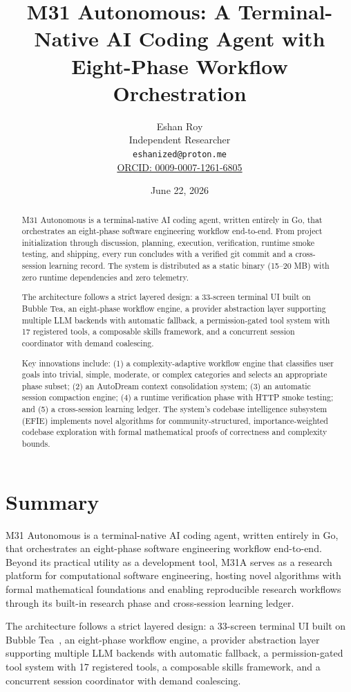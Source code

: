 \documentclass[11pt]{article}
\title{M31 Autonomous: A Terminal-Native AI Coding Agent with Eight-Phase Workflow Orchestration}
\author{
  Eshan Roy\\
  Independent Researcher\\
  \texttt{eshanized@proton.me}\\
  \href{https://orcid.org/0009-0007-1261-6805}{ORCID: 0009-0007-1261-6805}
}
\date{June 22, 2026}
\begin{document}
\maketitle

\begin{abstract}
M31 Autonomous is a terminal-native AI coding agent, written entirely in Go, that orchestrates an eight-phase software engineering workflow end-to-end. From project initialization through discussion, planning, execution, verification, runtime smoke testing, and shipping, every run concludes with a verified git commit and a cross-session learning record. The system is distributed as a static binary (15--20 MB) with zero runtime dependencies and zero telemetry.

The architecture follows a strict layered design: a 33-screen terminal UI built on Bubble Tea, an eight-phase workflow engine, a provider abstraction layer supporting multiple LLM backends with automatic fallback, a permission-gated tool system with 17 registered tools, a composable skills framework, and a concurrent session coordinator with demand coalescing.

Key innovations include: (1) a complexity-adaptive workflow engine that classifies user goals into trivial, simple, moderate, or complex categories and selects an appropriate phase subset; (2) an AutoDream context consolidation system; (3) an automatic session compaction engine; (4) a runtime verification phase with HTTP smoke testing; and (5) a cross-session learning ledger. The system's codebase intelligence subsystem (EFIE) implements novel algorithms for community-structured, importance-weighted codebase exploration with formal mathematical proofs of correctness and complexity bounds.
\end{abstract}

\section{Summary}

M31 Autonomous is a terminal-native AI coding agent, written entirely in Go, that orchestrates an eight-phase software engineering workflow end-to-end. Beyond its practical utility as a development tool, M31A serves as a research platform for computational software engineering, hosting novel algorithms with formal mathematical foundations and enabling reproducible research workflows through its built-in research phase and cross-session learning ledger.

The architecture follows a strict layered design: a 33-screen terminal UI built on Bubble Tea~\cite{bubbletea}, an eight-phase workflow engine, a provider abstraction layer supporting multiple LLM backends with automatic fallback, a permission-gated tool system with 17 registered tools, a composable skills framework, and a concurrent session coordinator with demand coalescing.
\end{document}

